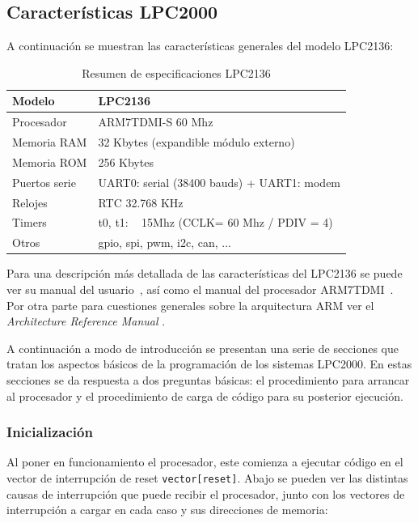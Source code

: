 \documentclass[10pt,a4paper]{article}
\begin{document}
	\subsection{Características LPC2000}
	
	A continuación se muestran las características generales del modelo LPC2136:
		
	\begin{table}[ht]
	\centering
	\begin{tabular}{|l|l|} \hline
	Modelo		&	LPC2136  \\ \hline
	Procesador	&	ARM7TDMI-S 60 Mhz \\ \hline
	Memoria  RAM	&	32 Kbytes (expandible módulo externo)\\ \hline
	Memoria  ROM	&	256 Kbytes \\ \hline
	Puertos serie	&	UART0: serial (38400 bauds) + UART1: modem \\ \hline
	Relojes		&	RTC 32.768 KHz \\ \hline
	Timers		&	t0, t1:  ~ 15Mhz (CCLK= 60 Mhz / PDIV = 4) \\ \hline
	Otros		&	gpio, spi, pwm, i2c, can, ... \\ \hline
	\end{tabular}
	
	\caption{Resumen de especificaciones LPC2136}
	\label{fig:resumen}
	\end{table}
	
	Para una descripción más detallada de las características del LPC2136 se puede ver su manual del usuario~\cite{lpc213x-um}, así como el manual del procesador ARM7TDMI~\cite{arm7tdmi-s}. Por otra parte para cuestiones generales sobre la arquitectura ARM ver el \emph{Architecture Reference Manual} \cite{armarm}.
	
	A continuación a modo de introducción se presentan una serie de secciones que tratan los aspectos básicos de la programación de los sistemas LPC2000. En estas secciones se da respuesta a dos preguntas básicas: el procedimiento para arrancar al procesador y el procedimiento de carga de código para su posterior ejecución.
	
	\subsubsection{Inicialización}
	
	Al poner en funcionamiento el procesador, este comienza a ejecutar código en el vector de interrupción de reset \texttt{vector[reset]}. Abajo se pueden ver las distintas causas de interrupción que puede recibir el procesador, junto con los vectores de interrupción a cargar en cada caso y sus direcciones de memoria:
\end{document}
